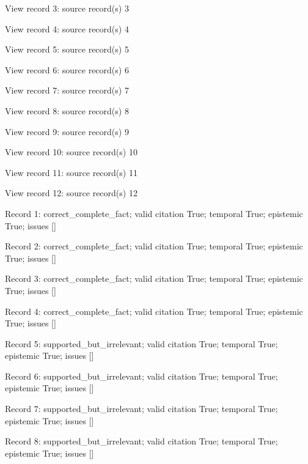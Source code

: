 View record 3: source record(s) 3\par

View record 4: source record(s) 4\par

View record 5: source record(s) 5\par

View record 6: source record(s) 6\par

View record 7: source record(s) 7\par

View record 8: source record(s) 8\par

View record 9: source record(s) 9\par

View record 10: source record(s) 10\par

View record 11: source record(s) 11\par

View record 12: source record(s) 12\par

Record 1: correct\_complete\_fact; valid citation True; temporal True; epistemic True; issues []\par

Record 2: correct\_complete\_fact; valid citation True; temporal True; epistemic True; issues []\par

Record 3: correct\_complete\_fact; valid citation True; temporal True; epistemic True; issues []\par

Record 4: correct\_complete\_fact; valid citation True; temporal True; epistemic True; issues []\par

Record 5: supported\_but\_irrelevant; valid citation True; temporal True; epistemic True; issues []\par

Record 6: supported\_but\_irrelevant; valid citation True; temporal True; epistemic True; issues []\par

Record 7: supported\_but\_irrelevant; valid citation True; temporal True; epistemic True; issues []\par

Record 8: supported\_but\_irrelevant; valid citation True; temporal True; epistemic True; issues []\par

